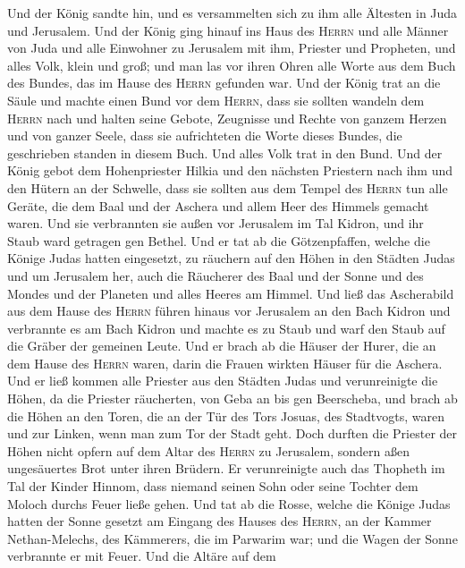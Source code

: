  Und der König sandte hin, und es versammelten sich zu ihm
alle Ältesten in Juda und Jerusalem.  Und der König ging
hinauf ins Haus des \textsc{Herrn} und alle Männer von Juda und alle
Einwohner zu Jerusalem mit ihm, Priester und Propheten, und alles Volk,
klein und groß; und man las vor ihren Ohren alle Worte aus dem Buch des
Bundes, das im Hause des \textsc{Herrn} gefunden war.  Und
der König trat an die Säule und machte einen Bund vor dem
\textsc{Herrn}, dass sie sollten wandeln dem \textsc{Herrn} nach und
halten seine Gebote, Zeugnisse und Rechte von ganzem Herzen und von
ganzer Seele, dass sie aufrichteten die Worte dieses Bundes, die
geschrieben standen in diesem Buch. Und alles Volk trat in den Bund.
 Und der König gebot dem Hohenpriester Hilkia und den
nächsten Priestern nach ihm und den Hütern an der Schwelle, dass sie
sollten aus dem Tempel des \textsc{Herrn} tun alle Geräte, die dem Baal
und der Aschera und allem Heer des Himmels gemacht waren. Und sie
verbrannten sie außen vor Jerusalem im Tal Kidron, und ihr Staub ward
getragen gen Bethel.  Und er tat ab die Götzenpfaffen,
welche die Könige Judas hatten eingesetzt, zu räuchern auf den Höhen in
den Städten Judas und um Jerusalem her, auch die Räucherer des Baal und
der Sonne und des Mondes und der Planeten und alles Heeres am Himmel.
 Und ließ das Ascherabild aus dem Hause des \textsc{Herrn}
führen hinaus vor Jerusalem an den Bach Kidron und verbrannte es am Bach
Kidron und machte es zu Staub und warf den Staub auf die Gräber der
gemeinen Leute.  Und er brach ab die Häuser der Hurer, die
an dem Hause des \textsc{Herrn} waren, darin die Frauen wirkten Häuser
für die Aschera.  Und er ließ kommen alle Priester aus den
Städten Judas und verunreinigte die Höhen, da die Priester räucherten,
von Geba an bis gen Beerscheba, und brach ab die Höhen an den Toren, die
an der Tür des Tors Josuas, des Stadtvogts, waren und zur Linken, wenn
man zum Tor der Stadt geht.  Doch durften die Priester der
Höhen nicht opfern auf dem Altar des \textsc{Herrn} zu Jerusalem,
sondern aßen ungesäuertes Brot unter ihren Brüdern.  Er
verunreinigte auch das Thopheth im Tal der Kinder Hinnom, dass niemand
seinen Sohn oder seine Tochter dem Moloch durchs Feuer ließe gehen.
 Und tat ab die Rosse, welche die Könige Judas hatten der
Sonne gesetzt am Eingang des Hauses des \textsc{Herrn}, an der Kammer
Nethan-Melechs, des Kämmerers, die im Parwarim war; und die Wagen der
Sonne verbrannte er mit Feuer.  Und die Altäre auf dem
